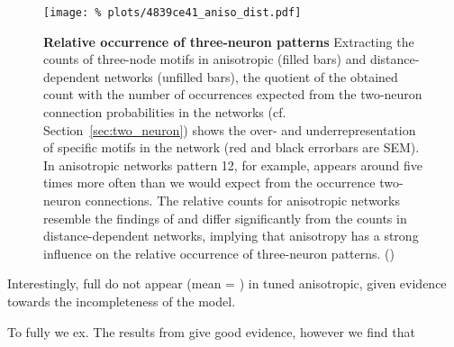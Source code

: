 \begin{figure}[H]
  \centering
  \texttt{[image: \%
    plots/4839ce41\_aniso\_dist.pdf]}


  \captionsetup{skip=8pt}
  \caption{\textbf{Relative occurrence of three-neuron patterns}
    Extracting the counts of three-node motifs in anisotropic (filled
    bars) and distance-dependent networks (unfilled bars), the
    quotient of the obtained count with the number of occurrences
    expected from the two-neuron connection probabilities in the
    networks (cf. Section~\ref{sec:two_neuron}) shows the over- and
    underrepresentation of specific motifs in the network (red and
    black errorbars are SEM). In anisotropic networks pattern 12, for
    example, appears around five times more often than we would expect
    from the occurrence two-neuron connections. The relative counts
    for anisotropic networks resemble the findings of
    \textcite{Song2005} and differ significantly from the counts in
    distance-dependent networks, implying that anisotropy has a strong
    influence on the relative occurrence of three-neuron
    patterns. () }
  \label{fig:distance_3motif_compare}
\end{figure}


Interestingly, full do not appear (mean = ) in tuned anisotropic,
given evidence towards the incompleteness of the model.


To fully we ex. The results from give good evidence, however we find
that

